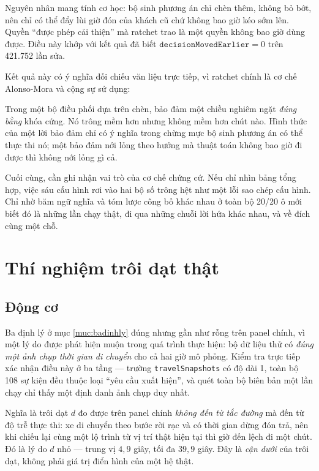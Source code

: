 Nguyên nhân mang tính cơ học: bộ sinh phương án chỉ chèn thêm, không bỏ bớt, nên chỉ có thể đẩy
lùi giờ đón của khách cũ chứ không bao giờ kéo sớm lên. Quyền ``được phép cải thiện'' mà ratchet
trao là một quyền không bao giờ dùng được. Điều này khớp với kết quả đã biết
$\mathtt{decisionMovedEarlier} = 0$ trên 421.752 lần sửa.

Kết quả này có ý nghĩa đối chiếu văn liệu trực tiếp, vì ratchet chính là cơ chế Alonso-Mora và
cộng sự sử dụng:

\begin{khungy}
Trong một bộ điều phối dựa trên chèn, bảo đảm một chiều nghiêm ngặt \emph{đúng bằng} khóa cứng.
Nó trông mềm hơn nhưng không mềm hơn chút nào. Hình thức của một lời bảo đảm chỉ có ý nghĩa
trong chừng mực bộ sinh phương án có thể thực thi nó; một bảo đảm nới lỏng theo hướng mà thuật
toán không bao giờ đi được thì không nới lỏng gì cả.
\end{khungy}

Cuối cùng, cần ghi nhận vai trò của cơ chế chứng cứ. Nếu chỉ nhìn bảng tổng hợp, việc sáu cấu
hình rơi vào hai bộ số trông hệt như một lỗi sao chép cấu hình. Chỉ nhờ băm ngữ nghĩa và tóm
lược công bố khác nhau ở toàn bộ 20/20 ô mới biết đó là những lần chạy thật, đi qua những chuỗi
lời hứa khác nhau, và về đích cùng một chỗ.

\section{Thí nghiệm trôi dạt thật}
\label{muc:troidat}

\subsection{Động cơ}

Ba định lý ở mục \ref{muc:badinhly} đúng nhưng gần như rỗng trên panel chính, vì một lý do được
phát hiện muộn
trong quá trình thực hiện: bộ dữ liệu thử có \emph{đúng một ảnh chụp thời gian di chuyển} cho cả
hai giờ mô phỏng. Kiểm tra trực tiếp xác nhận điều này ở ba tầng --- trường
\texttt{travelSnapshots} có độ dài 1, toàn bộ 108 sự kiện đều thuộc loại ``yêu cầu xuất hiện'',
và quét toàn bộ biên bản một lần chạy chỉ thấy một định danh ảnh chụp duy nhất.

Nghĩa là trôi dạt $d$ đo được trên panel chính \emph{không đến từ tắc đường} mà đến từ độ trễ
thực thi: xe di chuyển theo bước rời rạc và có thời gian dừng đón trả, nên khi chiếu lại cùng
một lộ trình từ vị trí thật hiện tại thì giờ đến lệch đi một chút. Đó là lý do $d$ nhỏ --- trung
vị $4{,}9$ giây, tối đa $39{,}9$ giây. Đây là \emph{cận dưới} của trôi dạt, không phải giá trị
điển hình của một hệ thật.

